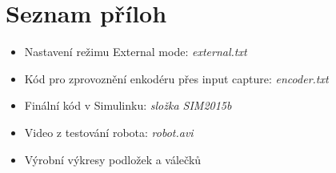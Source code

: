 \chapter{Seznam příloh}
\vspace{7mm}
\begin{itemize}
\item Nastavení režimu External mode: \textit{external.txt}
\item Kód pro zprovoznění enkodéru přes input capture: \textit{encoder.txt}
\item Finální kód v Simulinku: \textit{složka SIM2015b}
\item Video z testování robota: \textit{robot.avi}
\item Výrobní výkresy podložek a válečků

\end{itemize}

